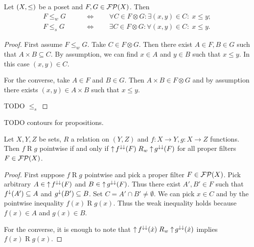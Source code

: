 \begin{lemma}
Let $\sSet{X,\leq}$ be a poset and $F,G\in\operatorname{\mathcal{FP}}(X)$. Then
\begin{align*}
F \leq_w G \qquad &\iff\qquad \forall C\in F\otimes G: \exists (x,y) \in C: \; x \leq y; \\
F \leq_s G \qquad &\iff\qquad \exists C\in F\otimes G: \forall (x,y) \in C: \; x \leq y.
\end{align*}
\end{lemma}
\begin{proof}
First assume $F\leq_w G$. Take $C\in F\otimes G$. Then there exist $A\in F, B\in G$ such that $A\times B \subseteq C$. By assumption, we can find $x\in A$ and $y\in B$ such that $x\leq y$. In this case $(x,y)\in C$.

For the converse, take $A\in F$ and $B\in G$. Then $A\times B\in F\otimes G$ and by assumption there exists $(x,y)\in A\times B$ such that $x\leq y$.

TODO $\leq_s$
\end{proof}
TODO contours for propositions.

\begin{proposition} \label{pointwisefunctionToFilterInequality}
Let $X,Y,Z$ be sets, $R$ a relation on $(Y,Z)$ and $f: X\to Y, g: X\to Z$ functions. Then $f\mathrel{R} g$ pointwise \textup{if and only if} $\operatorname{\uparrow} f^{\downarrow\downarrow}(F) \mathrel{R_w} \operatorname{\uparrow} g^{\downarrow\downarrow}(F)$ for all proper filters $F\in \operatorname{\mathcal{FP}}(X)$.
\end{proposition}
\begin{proof}
First suppose $f\mathrel{R} g$ pointwise and pick a proper filter $F\in \operatorname{\mathcal{FP}}(X)$. Pick arbitrary $A\in \operatorname{\uparrow} f^{\downarrow\downarrow}(F)$ and $B\in \operatorname{\uparrow} g^{\downarrow\downarrow}(F)$. Thus there exist $A',B'\in F$ such that $f^{\downarrow}(A')\subseteq A$ and $g^{\downarrow}(B')\subseteq B$. Set $C = A'\cap B' \neq \emptyset$. We can pick $x\in C$ and by the pointwise inequality $f(x) \mathrel{R} g(x)$. Thus the weak inequality holds because $f(x)\in A$ and $g(x)\in B$.

For the converse, it is enough to note that $\operatorname{\uparrow} f^{\downarrow\downarrow}(\dot{x}) \mathrel{R_w} \operatorname{\uparrow} g^{\downarrow\downarrow}(\dot{x})$ implies $f(x)\mathrel{R} g(x)$.
\end{proof}

